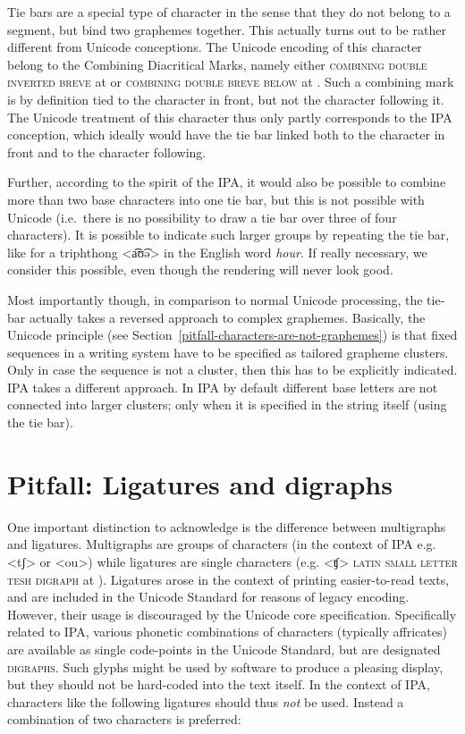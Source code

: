Tie bars are a special type of character in the sense that they do not belong to
a segment, but bind two graphemes together. This actually turns out to be rather
different from Unicode conceptions. The Unicode encoding of this character
belong to the Combining Diacritical Marks, namely either \textsc{combining double
inverted breve} at  or \textsc{combining double breve below} at
. Such a combining mark is by definition tied to the character in
front, but not the character following it. The Unicode treatment of this
character thus only partly corresponds to the IPA conception, which ideally
would have the tie bar linked both to the character in front and to the
character following. 

Further, according to the spirit of the IPA, it would also be possible to
combine more than two base characters into one tie bar, but this is not possible
with Unicode (i.e.~there is no possibility to draw a tie bar over three of four
characters). It is possible to indicate such larger groups by repeating the tie
bar, like for a triphthong <a͡ʊ͡ə> in the English word \textit{hour}. If really
necessary, we consider this possible, even though the rendering will never look
good. 

Most importantly though, in comparison to normal Unicode processing, the tie-bar
actually takes a reversed approach to complex graphemes. Basically, the Unicode
principle (see Section~\ref{pitfall-characters-are-not-graphemes}) is that fixed
sequences in a writing system have to be specified as tailored grapheme
clusters. Only in case the sequence is not a cluster, then this has to be
explicitly indicated. IPA takes a different approach. In IPA by default
different base letters are not connected into larger clusters; only when it is
specified in the string itself (using the tie bar).

\section{Pitfall: Ligatures and digraphs}
\label{pitfall-ligatures-digraphs}     


One important distinction to acknowledge is the difference between multigraphs
and ligatures. Multigraphs are groups of characters (in the context of IPA e.g.
<tʃ> or <ou>) while ligatures are single characters (e.g. <ʧ> \textsc{latin
small letter tesh digraph} at ). Ligatures arose in the context of
printing easier-to-read texts, and are included in the Unicode Standard for
reasons of legacy encoding. However, their usage is discouraged by the Unicode
core specification. Specifically related to IPA, various phonetic combinations
of characters (typically affricates) are available as single code-points in the
Unicode Standard, but are designated \textsc{digraphs}. Such glyphs might be used by
software to produce a pleasing display, but they should not be hard-coded into
the text itself. In the context of IPA, characters like the following ligatures
should thus \emph{not} be used. Instead a combination of two characters is
preferred:
      
